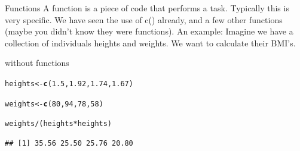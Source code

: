 \documentclass{beamer}\usepackage[]{graphicx}\usepackage[]{color}
\makeatletter
\newcommand{\hlnum}[1]{\textcolor[rgb]{0.686,0.059,0.569}{#1}}%
\newcommand{\hlopt}[1]{\textcolor[rgb]{0,0,0}{#1}}%
\newcommand{\hlstd}[1]{\textcolor[rgb]{0.345,0.345,0.345}{#1}}%
\newcommand{\hlkwb}[1]{\textcolor[rgb]{0.69,0.353,0.396}{#1}}%
\newcommand{\hlkwd}[1]{\textcolor[rgb]{0.737,0.353,0.396}{\textbf{#1}}}%
\newenvironment{kframe}{%
 \def\at@end@of@kframe{}%
 \ifinner\ifhmode%
  \def\at@end@of@kframe{\end{minipage}}%
  \begin{minipage}{\columnwidth}%
 \fi\fi%
 \def\FrameCommand##1{\hskip\@totalleftmargin \hskip-\fboxsep
 \colorbox{shadecolor}{##1}\hskip-\fboxsep
     \hskip-\linewidth \hskip-\@totalleftmargin \hskip\columnwidth}%
 \MakeFramed {\advance\hsize-\width
   \@totalleftmargin\z@ \linewidth\hsize
   \@setminipage}}%
 {\par\unskip\endMakeFramed%
 \at@end@of@kframe}
\newenvironment{knitrout}{}{} %
\makeatother
\begin{document}
\begin{frame}[fragile]{Functions}
A function is a piece of code that performs a task. Typically this is very specific.
\linebreak
\linebreak
We have seen the use of c() already, and a few other functions (maybe you didn’t know they were functions).
\linebreak
\linebreak
An example:
\linebreak
Imagine we have a collection of individuals heights and weights. We want to calculate their BMI's.
\end{frame}


\begin{frame}[fragile]{without functions}
\begin{knitrout}
\color{fgcolor}\begin{kframe}
\begin{alltt}
\hlstd{heights} \hlkwb{<-} \hlkwd{c}\hlstd{(}\hlnum{1.5}\hlstd{,} \hlnum{1.92}\hlstd{,} \hlnum{1.74}\hlstd{,} \hlnum{1.67}\hlstd{)}

\hlstd{weights} \hlkwb{<-} \hlkwd{c}\hlstd{(}\hlnum{80}\hlstd{,} \hlnum{94}\hlstd{,} \hlnum{78}\hlstd{,} \hlnum{58}\hlstd{)}

\hlstd{weights}\hlopt{/}\hlstd{(heights} \hlopt{*} \hlstd{heights)}
\end{alltt}
\begin{verbatim}
## [1] 35.56 25.50 25.76 20.80
\end{verbatim}
\end{kframe}
\end{knitrout}

\end{frame}
\end{document}

